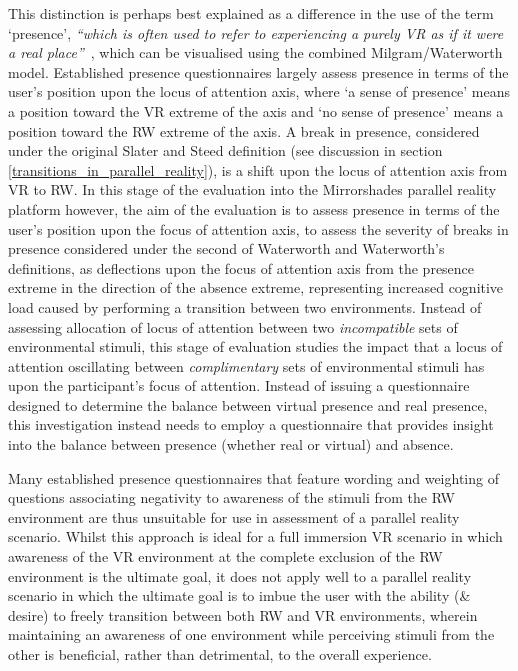 This distinction is perhaps best explained as a difference in the use of the term `presence', \textit{``which is often used to refer to experiencing a purely VR as if it were a real place''}~\cite{Steed2014}, which can be visualised using the combined Milgram/Waterworth model. Established presence questionnaires largely assess presence in terms of the user's position upon the locus of attention axis, where `a sense of presence' means a position toward the VR extreme of the axis and `no sense of presence' means a position toward the RW extreme of the axis. A break in presence, considered under the original Slater and Steed definition (see discussion in section \ref{transitions_in_parallel_reality}), is a shift upon the locus of attention axis from VR to RW. In this stage of the evaluation into the Mirrorshades parallel reality platform however, the aim of the evaluation is to assess presence in terms of the user's position upon the focus of attention axis, to assess the severity of breaks in presence considered under the second of Waterworth and Waterworth's definitions, as deflections upon the focus of attention axis from the presence extreme in the direction of the absence extreme, representing increased cognitive load caused by performing a transition between two environments. Instead of assessing allocation of locus of attention between two \textit{incompatible} sets of environmental stimuli, this stage of evaluation studies the impact that a locus of attention oscillating between \textit{complimentary} sets of environmental stimuli has upon the participant's focus of attention. Instead of issuing a questionnaire designed to determine the balance between virtual presence and real presence, this investigation instead needs to employ a questionnaire that provides insight into the balance between presence (whether real or virtual) and absence.

Many established presence questionnaires that feature wording and weighting of questions associating negativity to awareness of the stimuli from the RW environment are thus unsuitable for use in assessment of a parallel reality scenario. Whilst this approach is ideal for a full immersion VR scenario in which awareness of the VR environment at the complete exclusion of the RW environment is the ultimate goal, it does not apply well to a parallel reality scenario in which the ultimate goal is to imbue the user with the ability (\& desire) to freely transition between both RW and VR environments, wherein maintaining an awareness of one environment while perceiving stimuli from the other is beneficial, rather than detrimental, to the overall experience.

